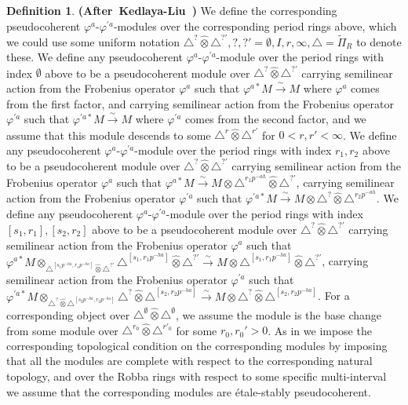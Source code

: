 \documentclass[12pt]{amsart}
\theoremstyle{definition}
\newtheorem{definition}[theorem]{Definition}
\numberwithin{equation}{section}
\begin{document}
\begin{definition} \mbox{\bf{(After Kedlaya-Liu \cite[Definition 4.4.4]{KL2})}}
We define the corresponding pseudocoherent $\varphi^a$-$\varphi^{'a}$-modules over the corresponding period rings above, which we could use some uniform notation $\triangle^?\widehat{\otimes}\triangle^{?'},?,?'=\emptyset,I,r,\infty,\triangle=\widetilde{\Pi}_{R}$ to denote these. We define any pseudocoherent $\varphi^a$-$\varphi^{'a}$-module over the period rings with index $\emptyset$ above to be a pseudocoherent module over $\triangle^?\widehat{\otimes}\triangle^{?'}$ carrying semilinear action from the Frobenius operator $\varphi^a$ such that $\varphi^{a*}M\overset{\sim}{\rightarrow}M$ where $\varphi^a$ comes from the first factor, and carrying semilinear action from the Frobenius operator $\varphi^{'a}$ such that $\varphi^{'a*}M\overset{\sim}{\rightarrow}M$ where $\varphi^{'a}$ comes from the second factor, and we assume that this module descends to some $\triangle^r\widehat{\otimes}\triangle^{r'}$ for $0<r,r'<\infty$. We define any pseudocoherent $\varphi^a$-$\varphi^{'a}$-module over the period rings with index $r_1,r_2$ above to be a pseudocoherent module over $\triangle^?\widehat{\otimes}\triangle^{?'}$ carrying semilinear action from the Frobenius operator $\varphi^a$ such that $\varphi^{a*}M\overset{\sim}{\rightarrow}M\otimes \triangle^{r_1p^{-ah}}\widehat{\otimes}\triangle^{?'}$, carrying semilinear action from the Frobenius operator $\varphi^{'a}$ such that $\varphi^{'a*}M\overset{\sim}{\rightarrow}M\otimes \triangle^?\widehat{\otimes}\triangle^{r_2p^{-ah}}$. We define any pseudocoherent $\varphi^a$-$\varphi^{'a}$-module over the period rings with index $[s_1,r_1],[s_2,r_2]$ above to be a pseudocoherent module over $\triangle^?\widehat{\otimes}\triangle^{?'}$ carrying semilinear action from the Frobenius operator $\varphi^a$ such that $\varphi^{a*}M\otimes_{\triangle^{[s_1p^{-ha},r_1p^{-ha}]}\widehat{\otimes}\triangle^{?'}} \triangle^{[s_1,r_1p^{-ha}]} \widehat{\otimes}\triangle^{?'}\overset{\sim}{\rightarrow}M\otimes \triangle^{[s_1,r_1p^{-ha}]}\widehat{\otimes}\triangle^{?'}$, carrying semilinear action from the Frobenius operator $\varphi^{'a}$ such that $\varphi^{'a*}M\otimes_{\triangle^?\widehat{\otimes}\triangle^{[s_2p^{-ha},r_2p^{-ha}]}} \triangle^?\widehat{\otimes}\triangle^{[s_2,r_2p^{-ha}]}\overset{\sim}{\rightarrow}M\otimes \triangle^?\widehat{\otimes}\triangle^{[s_2,r_2p^{-ha}]}$. For a corresponding object over $\triangle^\emptyset\widehat{\otimes}\triangle^\emptyset$, we assume the module is the base change from some module over $\triangle^{r_0}\widehat{\otimes}\triangle^{r'_0}$ for some $r_0,r_0'>0$. As in \cite[Definition 4.4.4]{KL2} we impose the corresponding topological condition on the corresponding modules by imposing that all the modules are complete with respect to the corresponding natural topology, and over the Robba rings with respect to some specific multi-interval we assume that the corresponding modules are \'etale-stably pseudocoherent.
\end{definition}
\end{document}
